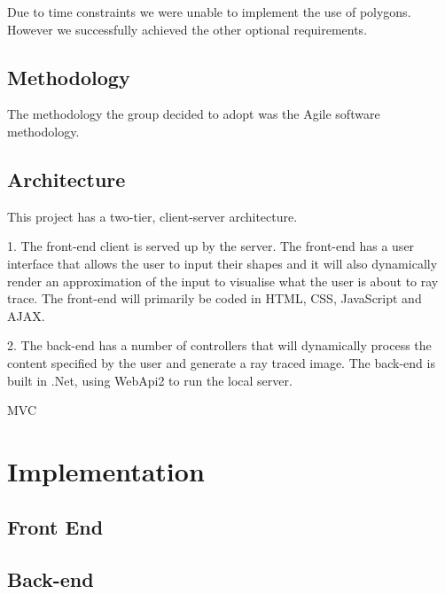 \documentclass{article}
\begin{document}
	Due to time constraints we were unable to implement the use of polygons. However we successfully achieved the other optional requirements. 
	
	
	\subsection{Methodology}
	
	The methodology the group decided to adopt was the Agile software methodology. 
	
	\subsection{Architecture}
	
	
	This project has a two-tier, client-server architecture.
	
	1.  The front-end client is served up by the server.  The front-end has a user interface that allows the user to input their shapes and it will also dynamically render an approximation of the input to visualise what the user is about to ray trace.  The front-end will primarily be coded in HTML, CSS, JavaScript and AJAX.
	
	2.   The  back-end  has  a  number  of  controllers  that  will  dynamically  process  the content specified by the user and generate a ray traced image.  The back-end is built in .Net, using WebApi2 to run the local server.
	
	MVC
	
	\section{Implementation}
	
	
	\subsection{Front End}
	\subsection{Back-end}
\end{document}
